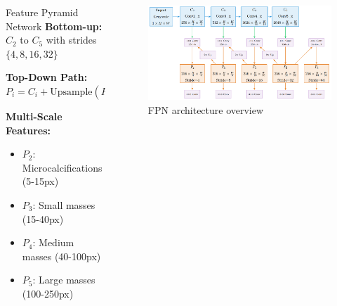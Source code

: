 \documentclass[8pt,aspectratio=169,xcolor=dvipsnames]{beamer}
\begin{document}
\begin{frame}
{\begin{columns}[T]
\begin{column}{0.48\textwidth}
\begin{block}{Feature Pyramid Network}
\textbf{Bottom-up:} $C_2$ to $C_5$ with strides $\{4,8,16,32\}$

\textbf{Top-Down Path:} $P_i = C_i + \text{Upsample}(P_{i+1})$

\textbf{Multi-Scale Features:}
\begin{itemize}
\item $P_2$: Microcalcifications (5-15px)
\item $P_3$: Small masses (15-40px)
\item $P_4$: Medium masses (40-100px)
\item $P_5$: Large masses (100-250px)
\end{itemize}
\end{block}
\end{column}

\begin{column}{0.48\textwidth}
\begin{figure}
    \centering
    \includegraphics[width=\linewidth]{fpn_overview.png}
    \caption{FPN architecture overview}
    \label{fig:enter-label}
\end{figure}
\end{column}
\end{columns}
}

\end{frame}
\end{document}
